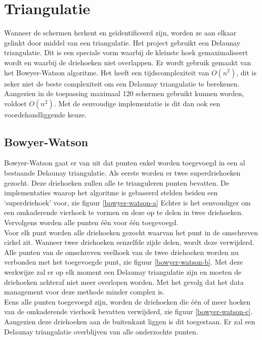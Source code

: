 \section{Triangulatie} \label{sec:triangulatie}
Wanneer de schermen herkent en geïdentificeerd zijn, worden ze aan elkaar gelinkt door middel van een triangulatie. Het project gebruikt een Delaunay triangulatie. Dit is een speciale vorm waarbij de kleinste hoek gemaximaliseert wordt en waarbij de driehoeken niet overlappen. \cite{delaunaywiki}
Er wordt gebruik gemaakt van het Bowyer-Watson algoritme. \cite{Bowyer-WatsonWiki} Het heeft een tijdscomplexiteit van $O(n^2)$, dit is zeker niet de beste complexiteit om een Delaunay triangulatie te berekenen. Aangezien in de toepassing maximaal 120 schermen gebruikt kunnen worden, voldoet $O(n^2)$. Met de eenvoudige implementatie is dit dan ook een voordehandliggende keuze.

\subsection{Bowyer-Watson}
Bowyer-Watson gaat er van uit dat punten enkel worden toegevoegd in een al bestaande Delaunay triangulatie. Als eerste worden er twee superdriehoeken gezocht. Deze driehoeken zullen alle te trianguleren punten bevatten. De implementaties waarop het algoritme is gebaseerd \cite{Bowyer-WatsonWiki} \cite{bowyer-watsonImplementation} stelden beiden een `superdriehoek' voor, zie figuur \ref{bowyer-watson-a} Echter is het eenvoudiger om een omkaderende vierhoek te vormen en deze op te delen in twee driehoeken. Vervolgens worden alle punten één voor één toegevoegd.\\[3mm]
Voor elk punt worden alle driehoeken gezocht waarvan het punt in de omschreven cirkel zit. Wanneer twee driehoeken eenzelfde zijde delen, wordt deze verwijderd. Alle punten van de omschreven veelhoek van de twee driehoeken worden nu verbonden met het toegevoegde punt, zie figuur \ref{bowyer-watson-b}. Met deze werkwijze zal er op elk moment een Delaunay triangulatie zijn en moeten de driehoeken achteraf niet meer overlopen worden. Met het gevolg dat het data management voor deze methode minder complex is.\\[3mm]
Eens alle punten toegevoegd zijn, worden de driehoeken die één of meer hoeken van de omkaderende vierhoek bevatten verwijderd, zie figuur \ref{bowyer-watson-c}. Aangezien deze driehoeken aan de buitenkant liggen is dit toegestaan. Er zal een Delaunay triangulatie overblijven van alle onderzochte punten.

